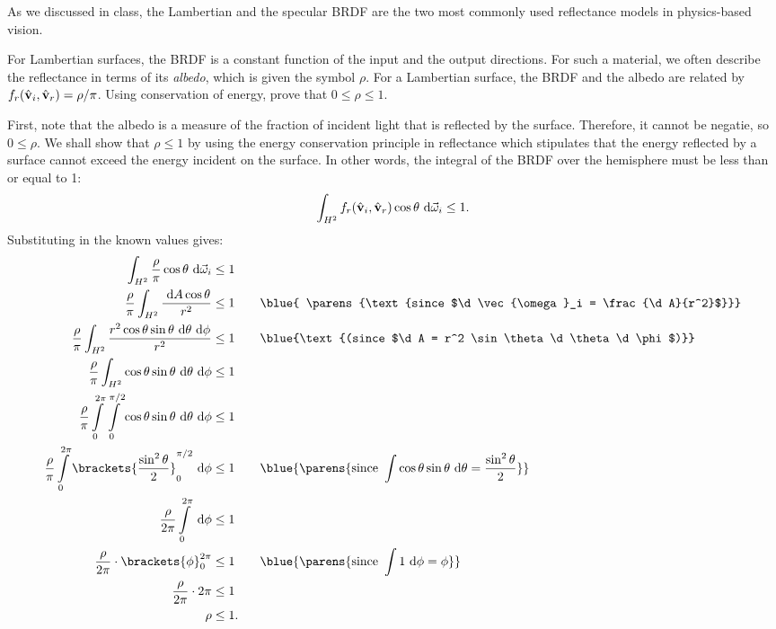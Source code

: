 \begin{problem}
  As we discussed in class, the Lambertian and the specular BRDF are the
  two most commonly used reflectance models in physics-based vision.
  \begin{enumroman}
    \item For Lambertian surfaces, the BRDF is a constant function of the input
      and the output directions. For such a material, we often describe the
      reflectance in terms of its \emph{albedo}, which is given the symbol $\rho$.
      For a Lambertian surface, the BRDF and the albedo are related by
      $f_r(\hat{\mathbf{v}}_i, \hat{\mathbf{v}}_r) = \rho/\pi$.
      Using conservation of energy, prove that $0 \leq \rho \leq 1$.
      \begin{answer}
        First, note that the albedo is a measure of the fraction of incident
        light that is reflected by the surface. Therefore,
        it cannot be negatie, so $0 \leq \rho$.
        We shall show that $\rho \leq 1$ by using the energy conservation
        principle in reflectance which stipulates that
        the energy reflected by a surface cannot exceed the energy incident
        on the surface. In other words, the integral of the BRDF over the
        hemisphere must be less than or equal to 1:
        \[
          \int_{H^2} f_r(\hat{\mathbf{v}}_i, \hat{\mathbf{v}}_r) \cos \theta \text{ d}\vec{\omega}_i \leq 1.
        \]
        Substituting in the known values gives:
        \begin{align*}
          \int_{H^2} \frac{\rho}{\pi} \cos \theta \d\vec{\omega}_i &\leq 1 \\
          \frac{\rho}{\pi} \int_{H^2} \frac{\d A \cos\theta }{r^2} &\leq 1
          \qquad\blue{ \parens{\text{since $\d \vec{\omega}_i = \frac{\d A}{r^2}$}}} \\
          \frac{\rho}{\pi} \int_{H^2} \frac{r^2 \cos\theta \sin \theta \d \theta \d \phi}{r^2} &\leq 1
          \qquad\blue{\text{(since $\d A = r^2 \sin \theta \d \theta \d \phi$)}}\\
          \frac{\rho}{\pi} \int_{H^2} \cos\theta \sin \theta \d \theta \d \phi &\leq 1 \\
          \frac{\rho}{\pi} \int\limits_{0}^{2\pi} \int\limits_{0}^{\pi/2} \cos\theta \sin \theta \d \theta \d \phi &\leq 1 \\
          \frac{\rho}{\pi} \int\limits_{0}^{2\pi} \brackets{\frac{\sin^2\theta}{2} }_0^{\pi/2} \d \phi &\leq 1
          \qquad\blue{\parens{\text{since }\int \cos\theta \sin\theta \d \theta = \frac{\sin^2\theta}{2}}} \\
          \frac{\rho}{2\pi} \int\limits_{0}^{2\pi} \d \phi &\leq 1 \\
          \frac{\rho}{2\pi} \cdot \brackets{\phi}_0^{2 \pi} &\leq 1
          \qquad\blue{\parens{\text{since }\int 1 \d \phi = \phi}} \\
          \frac{\rho}{2\pi} \cdot 2\pi &\leq 1 \\
          \rho &\leq 1.
        \end{align*}
      \end{answer}


\end{enumroman}
\end{problem}
